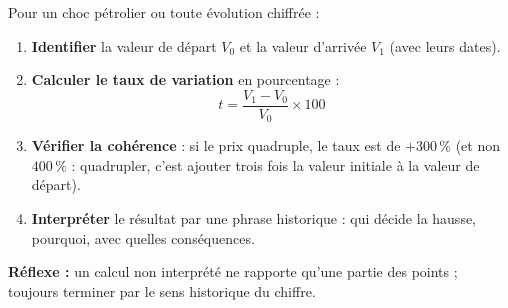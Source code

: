 \documentclass[11pt]{article}
\begin{document}
\begin{methode}
Pour un choc pétrolier ou toute évolution chiffrée :
\begin{enumerate}
\item \textbf{Identifier} la valeur de départ $V_0$ et la valeur d'arrivée $V_1$ (avec leurs dates).
\item \textbf{Calculer le taux de variation} en pourcentage :
\[ t = \frac{V_1 - V_0}{V_0} \times 100 \]
\item \textbf{Vérifier la cohérence} : si le prix quadruple, le taux est de $+300\,\%$ (et non $400\,\%$ : quadrupler, c'est ajouter trois fois la valeur initiale à la valeur de départ).
\item \textbf{Interpréter} le résultat par une phrase historique : qui décide la hausse, pourquoi, avec quelles conséquences.
\end{enumerate}
\textbf{Réflexe :} un calcul non interprété ne rapporte qu'une partie des points ; toujours terminer par le sens historique du chiffre.
\end{methode}
\end{document}
